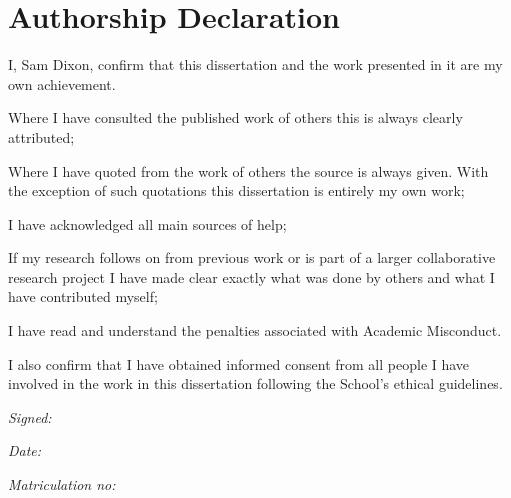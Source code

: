 \section*{Authorship Declaration}
	\vspace{0.5cm}
	\begin{flushleft}
		I, Sam Dixon, confirm that this dissertation and the work presented in it are my own achievement.\newline
		
		Where I have consulted the published work of others this is always clearly attributed;\newline
		
		Where I have quoted from the work of others the source is always given. With the exception of such quotations this dissertation is entirely my own work;\newline
		
		I have acknowledged all main sources of help; \newline
		
		If my research follows on from previous work or is part of a larger collaborative research project I have made clear exactly what was done by others and what I have contributed myself;\newline
		
		I have read and understand the penalties associated with Academic Misconduct.\newline
		
		I also confirm that I have obtained informed consent from all people I have involved in the work in this dissertation following the School's ethical guidelines.\newline
	\end{flushleft}
	
	\begin{flushleft} \large
		\emph{Signed:} \\
	\end{flushleft}
	
	\vspace{.5cm}
	
	\begin{flushleft} \large
		\emph{Date:} \\
	\end{flushleft}
	
	\vspace{.5cm}
	
	\begin{flushleft} \large
		\emph{Matriculation no: }  \\
	\end{flushleft}

\pagebreak
